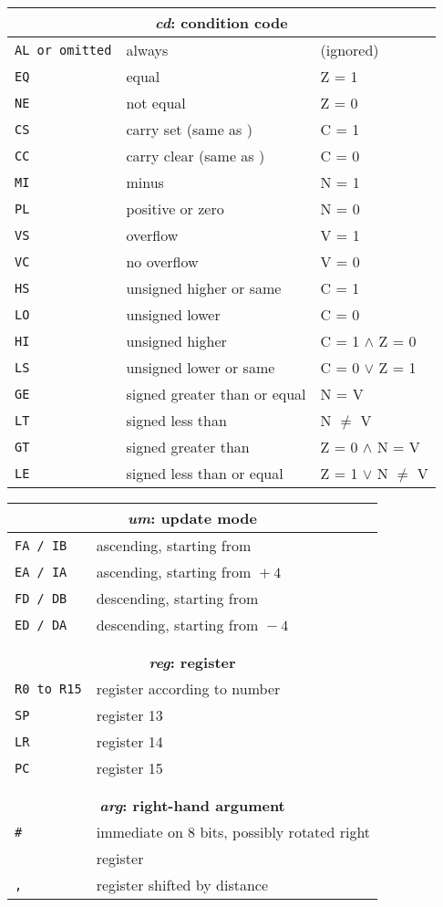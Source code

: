 \documentclass[a4paper,twoside,10pt]{article}
\begin{document}
	\def\code#1#2#3{\texttt{#1} & \small #2 & #3\\}
	
	
	\begin{table}[p!]\centering
				
		
		\begin{tabular}{l@{\hspace{5mm}}ll}
			\multicolumn{3}{c}{\bfseries \emph{cd}: condition code} \\
			\hline
				\code{AL \textrm{or omitted}}{always}{(ignored)}
				\code{EQ}{equal}{Z = 1}
				\code{NE}{not equal}{Z = 0}
				\code{CS}{carry set (same as \kword{HS})}{C = 1}
				\code{CC}{carry clear (same as \kword{LO})}{C = 0}
				\code{MI}{minus}{N = 1}
				\code{PL}{positive or zero}{N = 0}
				\code{VS}{overflow}{V = 1}
				\code{VC}{no overflow}{V = 0}
				\code{HS}{unsigned higher or same}{C = 1}
				\code{LO}{unsigned lower}{C = 0}
				\code{HI}{unsigned higher}{C = 1 $\wedge$ Z = 0}
				\code{LS}{unsigned lower or same}{C = 0 $\vee$ Z = 1}
				\code{GE}{signed greater than or equal}{N = V}
				\code{LT}{signed less than}{N $\neq$ V}
				\code{GT}{signed greater than}{Z = 0 $\wedge$ N = V}
				\code{LE}{signed less than or equal}{Z = 1 $\vee$ N $\neq$ V}\hline
				
		\end{tabular}
		\hfill
		\def\code#1#2{\texttt{#1} &\small #2 \\}
		\begin{tabular}{l@{\hspace{5mm}}l}
			\multicolumn{2}{c}{\bfseries \emph{um}: update mode} \\
			\hline
			\code{FA / IB}{ascending, starting from \reg}
			\code{EA / IA}{ascending, starting from \reg ${}+{} 4$}
			\code{FD / DB}{descending, starting from \reg}
			\code{ED / DA}{descending, starting from \reg ${}- 4$}\hline
			&\\
			&\\
			\multicolumn{2}{c}{\bfseries \emph{reg}: register} \\
			\hline
			\code{R0 \textrm{to} R15}{register according to number}
			\code{SP}{register 13}
			\code{LR}{register 14}
			\code{PC}{register 15}\hline
			&\\
			&\\
			\multicolumn{2}{c}{\bfseries \emph{arg}: right-hand argument} \\
			\hline
			\code{\#\imm[8]}{immediate on 8 bits, possibly rotated right}
			\code{\reg}{register}
			\code{\reg, \shift}{register shifted by distance}\hline
		\end{tabular}
				
	\end{table}
	
\end{document}
